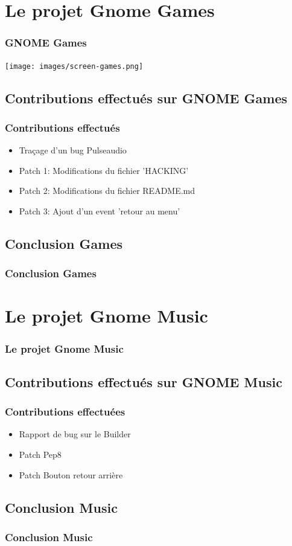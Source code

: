 \documentclass{beamer}
\begin{document}
\section{Le projet Gnome Games}
\begin{frame}
  \frametitle{GNOME Games}
  \texttt{[image: images/screen-games.png]}
\end{frame}

\subsection{Contributions effectués sur GNOME Games}
\begin{frame}
  \frametitle{Contributions effectués}
  \begin{itemize}
    \item Traçage d'un bug Pulseaudio
    \item Patch 1: Modifications du fichier 'HACKING'
    \item Patch 2: Modifications du fichier README.md
    \item Patch 3: Ajout d'un event 'retour au menu'
  \end{itemize}
\end{frame}

\subsection{Conclusion Games}
\begin{frame}
  \frametitle{Conclusion Games}
\end{frame}

\section{Le projet Gnome Music}
\begin{frame}
  \frametitle{Le projet Gnome Music}
\end{frame}

\subsection{Contributions effectués sur GNOME Music}
\begin{frame}
  \frametitle{Contributions effectuées}
  \begin{itemize}
  \item Rapport de bug sur le Builder
  \item Patch Pep8
  \item Patch Bouton retour arrière
  \end{itemize}
\end{frame}

\subsection{Conclusion Music}
\begin{frame}
  \frametitle{Conclusion Music}
\end{frame}
\end{document}
